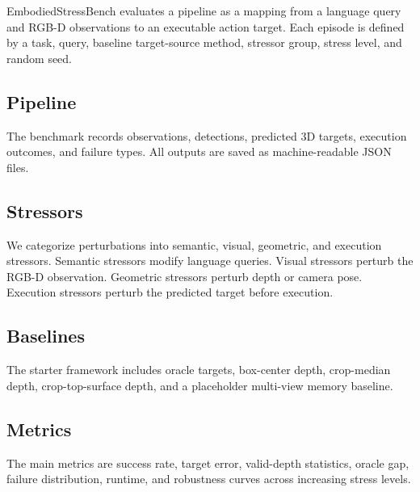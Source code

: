 EmbodiedStressBench evaluates a pipeline as a mapping from a language query and RGB-D observations to an executable action target. Each episode is defined by a task, query, baseline target-source method, stressor group, stress level, and random seed.

\subsection{Pipeline}
The benchmark records observations, detections, predicted 3D targets, execution outcomes, and failure types. All outputs are saved as machine-readable JSON files.

\subsection{Stressors}
We categorize perturbations into semantic, visual, geometric, and execution stressors. Semantic stressors modify language queries. Visual stressors perturb the RGB-D observation. Geometric stressors perturb depth or camera pose. Execution stressors perturb the predicted target before execution.

\subsection{Baselines}
The starter framework includes oracle targets, box-center depth, crop-median depth, crop-top-surface depth, and a placeholder multi-view memory baseline.

\subsection{Metrics}
The main metrics are success rate, target error, valid-depth statistics, oracle gap, failure distribution, runtime, and robustness curves across increasing stress levels.
